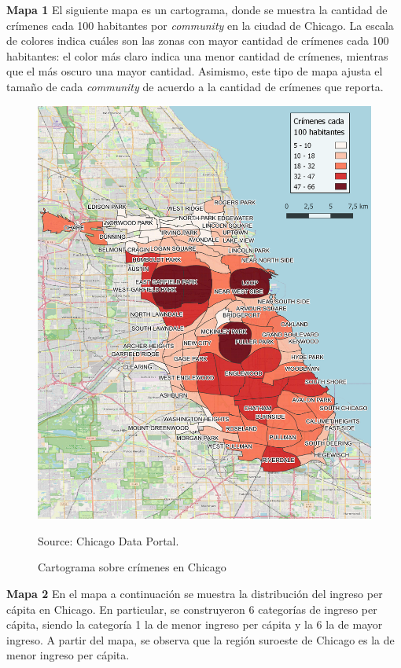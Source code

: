 \documentclass[11pt]{article}
\newcommand{\source}[1]{\caption*{Source: {#1}} }
\begin{document}
\textbf{Mapa 1}
El siguiente mapa es un cartograma, donde se muestra la cantidad de crímenes cada 100 habitantes por \textit{community} en la ciudad de Chicago. La escala de colores indica cuáles son las zonas con mayor cantidad de crímenes cada 100 habitantes: el color más claro indica una menor cantidad de crímenes, mientras que el más oscuro una mayor cantidad. Asimismo, este tipo de mapa ajusta el tamaño de cada \textit{community} de acuerdo a la cantidad de crímenes que reporta.

\begin{figure}[H]
    \centering
    \caption{Cartograma sobre crímenes en Chicago}
    \includegraphics[scale=0.6]{mapa 1 airbnb.png}
    \source{Chicago Data Portal.}
    \label{fig:1}
\end{figure}

\newpage
\textbf{Mapa 2} En el mapa a continuación se muestra la distribución del ingreso per cápita en Chicago. En particular, se construyeron 6 categorías de ingreso per cápita, siendo la categoría 1 la de menor ingreso per cápita y la 6 la de mayor ingreso. A partir del mapa, se observa que la región suroeste de Chicago es la de menor ingreso per cápita.
\end{document}
